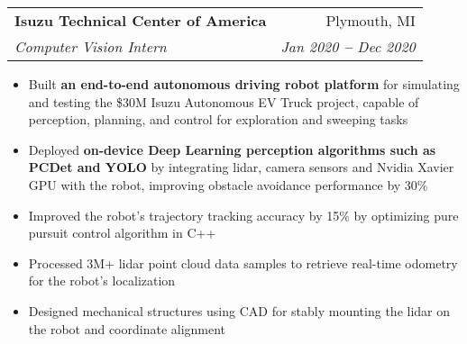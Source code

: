 \documentclass[letterpaper,11pt]{article}
\makeatletter
\newcommand{\resumeItem}[1]{
  \item\small{
    {#1 \vspace{-2pt}}
  }
}
\newcommand{\resumeSubheading}[4]{
  \vspace{-2pt}\item
    \begin{tabular*}{0.97\textwidth}[t]{l@{\extracolsep{\fill}}r}
      \textbf{#1} & #2 \\
      \textit{\small#3} & \textit{\small #4} \\
    \end{tabular*}\vspace{-7pt}
}
\newcommand{\resumeItemListStart}{\begin{itemize}}
\newcommand{\resumeItemListEnd}{\end{itemize}\vspace{-5pt}}
\makeatother
\begin{document}
    \resumeSubheading
      {Isuzu Technical Center of America}{Plymouth, MI}
      {Computer Vision Intern}{Jan 2020 \textbf{--} Dec 2020}
        \resumeItemListStart
            \resumeItem{Built \textbf{an end-to-end autonomous driving robot platform} for simulating and testing the \$30M Isuzu Autonomous EV Truck project, capable of perception, planning, and control for exploration and sweeping tasks}
            \resumeItem{Deployed \textbf{on-device Deep Learning perception algorithms such as PCDet and YOLO} by integrating lidar, camera sensors and Nvidia Xavier GPU with the robot, improving obstacle avoidance performance by 30\%}
            \resumeItem{Improved the robot’s trajectory tracking accuracy by 15\% by optimizing pure pursuit control algorithm in C++}
            \resumeItem{Processed 3M+ lidar point cloud data samples to retrieve real-time odometry for the robot's localization}
            \resumeItem{Designed mechanical structures using CAD for stably mounting the lidar on the robot and coordinate alignment}
        \resumeItemListEnd

\end{document}
